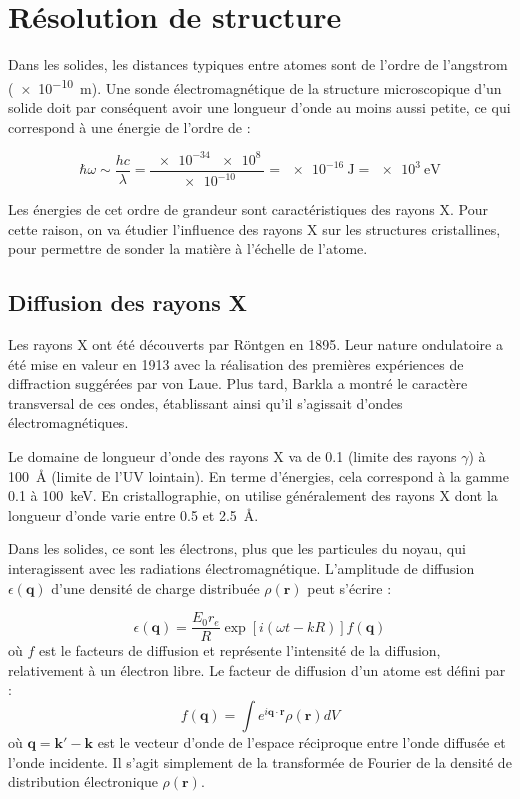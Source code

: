 \chapter{Résolution de structure}

Dans les solides, les distances typiques entre atomes sont de l'ordre de 
l'angstrom (\SI{e-10}{\metre}). Une sonde électromagnétique de la structure
microscopique d'un solide doit par conséquent avoir une longueur d'onde au
moins aussi petite, ce qui correspond à une énergie de l'ordre de :

\begin{equation}
\hbar \omega \sim \frac{hc}{\lambda} = \frac{\SI{e-34}{}\SI{e8}{}}{\SI{e-10}{}} = \SI{e-16}{\joule} = \SI{e3}{\electronvolt}
\end{equation}

Les énergies de cet ordre de grandeur sont caractéristiques des rayons X. Pour 
cette raison, on va étudier l'influence des rayons X sur les structures
cristallines, pour permettre de sonder la matière à l'échelle de l'atome.


\section{Diffusion des rayons X}

Les rayons X ont été découverts par Röntgen en 1895. Leur nature ondulatoire a
été mise en valeur en 1913 avec la réalisation des premières expériences de
diffraction suggérées par von Laue. Plus tard, Barkla a montré le caractère
transversal de ces ondes, établissant ainsi qu'il s'agissait d'ondes
électromagnétiques.

Le domaine de longueur d'onde des rayons X va de 0.1 (limite des rayons
$\gamma$) à \SI{100}{\angstrom} (limite de l'UV lointain). En terme d'énergies,
cela correspond à la gamme 0.1 à \SI{100}{\kilo\electronvolt}. En
cristallographie, on utilise généralement des rayons X dont la longueur d'onde 
varie entre 0.5 et \SI{2.5}{\angstrom}.

Dans les solides, ce sont les électrons, plus que les particules du noyau, qui
interagissent avec les radiations électromagnétique. L'amplitude de diffusion
$\epsilon(\mathbf{q})$ d'une densité de charge distribuée $\rho(\mathbf{r})$ peut
s'écrire :

\begin{equation}
    \epsilon(\mathbf{q}) = \frac{E_0 r_e}{R} \exp [i(\omega t - k R)] f(\mathbf{q})
\end{equation}
où $f$ est le facteurs de diffusion et représente l'intensité de la diffusion,
relativement à un électron libre. Le facteur de diffusion d'un atome est défini
par :
\begin{equation}
    f(\mathbf{q}) = \int e^{i\mathbf{q}\cdot\mathbf{r}} \rho(\mathbf{r}) dV
\end{equation}
où $\mathbf{q = k' - k}$ est le vecteur d'onde de l'espace réciproque entre
l'onde diffusée et l'onde incidente. Il s'agit simplement de la transformée de
Fourier de la densité de distribution électronique $\rho(\mathbf{r})$.

